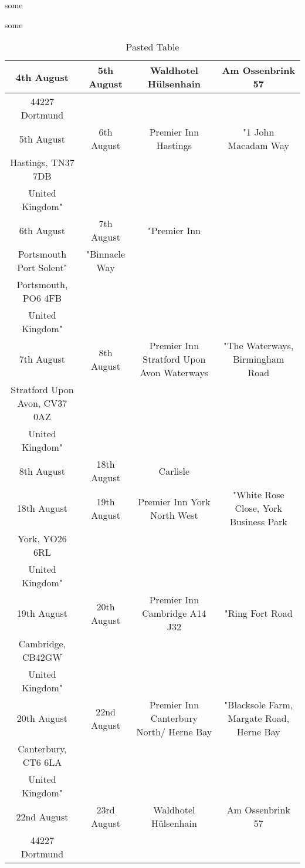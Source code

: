 
some 

\begin{enumerate} some 
  
\end{enumerate}

\begin{table}[htdp]
\begin{center}
\begin{tabular}{|c|c|c|c|} \hline
 4th August & 5th August & Waldhotel Hülsenhain & Am Ossenbrink 57 \\ \hline
 44227 Dortmund &&&\\ \hline
 5th August & 6th August & Premier Inn Hastings & "1 John Macadam Way \\ \hline
 Hastings, TN37 7DB &&&\\ \hline
 United Kingdom" &&&\\ \hline
 6th August & 7th August & "Premier Inn  &\\ \hline
 Portsmouth Port Solent" & "Binnacle Way &&\\ \hline
 Portsmouth, PO6 4FB &&&\\ \hline
 United Kingdom" &&&\\ \hline
 7th August & 8th August & Premier Inn Stratford Upon Avon Waterways & "The Waterways, Birmingham Road \\ \hline
 Stratford Upon Avon, CV37 0AZ &&&\\ \hline
 United Kingdom" &&&\\ \hline
 8th August & 18th August & Carlisle &  \\ \hline
 18th August & 19th August & Premier Inn York North West & "White Rose Close, York Business Park \\ \hline
 York, YO26 6RL &&&\\ \hline
 United Kingdom" &&&\\ \hline
 19th August & 20th August & Premier Inn Cambridge A14 J32 & "Ring Fort Road \\ \hline
 Cambridge, CB42GW &&&\\ \hline
 United Kingdom" &&&\\ \hline
 20th August & 22nd August & Premier Inn Canterbury North/ Herne Bay & "Blacksole Farm, Margate Road, Herne Bay \\ \hline
 Canterbury, CT6 6LA &&&\\ \hline
 United Kingdom" &&&\\ \hline
 22nd August & 23rd August & Waldhotel Hülsenhain & Am Ossenbrink 57 \\ \hline
 44227 Dortmund &&&\\ \hline
\end{tabular}
\end{center}
\caption{Pasted Table}
\label{tab:pastedTable}
\end{table}
